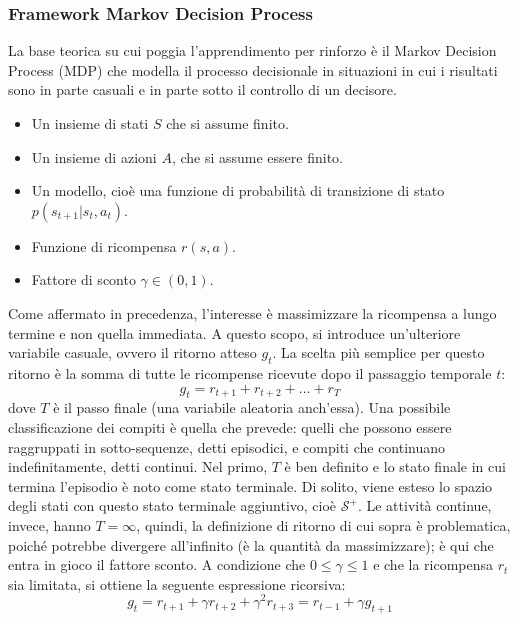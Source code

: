 \subsubsection{Framework Markov Decision Process}
La base teorica su cui poggia l'apprendimento per rinforzo è il Markov Decision Process (MDP) che modella il processo decisionale in situazioni in cui i risultati sono in parte casuali e in parte sotto il controllo di un decisore.
\begin{itemize}
    \item Un insieme di stati $S$ che si assume finito.
    \item Un insieme di azioni $A$, che si assume essere finito.
    \item Un modello, cioè una funzione di probabilità di transizione di stato $p(s_{t+1}|s_t,a_t)$.
    \item Funzione di ricompensa $r(s,a)$.
    \item Fattore di sconto $\gamma \in (0,1)$.
\end{itemize}
Come affermato in precedenza, l'interesse è massimizzare la ricompensa a lungo termine e non quella immediata. A questo scopo, si introduce un'ulteriore variabile casuale, ovvero il ritorno atteso $g_t$. La scelta più semplice per questo ritorno è la somma di tutte le ricompense ricevute dopo il passaggio temporale $t$:
\begin{equation}g_t=r_{t+1}+r_{t+2}+...+r_{T}\end{equation}
dove $T$ è il passo finale (una variabile aleatoria anch'essa). Una possibile classificazione dei compiti è quella che prevede: quelli che possono essere raggruppati in sotto-sequenze, detti episodici, e compiti che continuano indefinitamente, detti continui. Nel primo, $T$ è ben definito e lo stato finale in cui termina l'episodio è noto come stato terminale. Di solito, viene esteso lo spazio degli stati con questo stato terminale aggiuntivo, cioè $\mathcal{S}^+$. Le attività continue, invece, hanno $T = \infty$, quindi, la definizione di ritorno di cui sopra è problematica, poiché potrebbe divergere all'infinito (è la quantità da massimizzare); è qui che entra in gioco il fattore sconto. A condizione che $0 \leq \gamma \leq 1$ e che la ricompensa $r_t$ sia limitata, si ottiene la seguente espressione ricorsiva:
\begin{equation}g_t= r_{t+1}+\gamma r_{t+2}+\gamma^2 r_{t+3}=r_{t-1}+\gamma g_{t+1}\end{equation}


